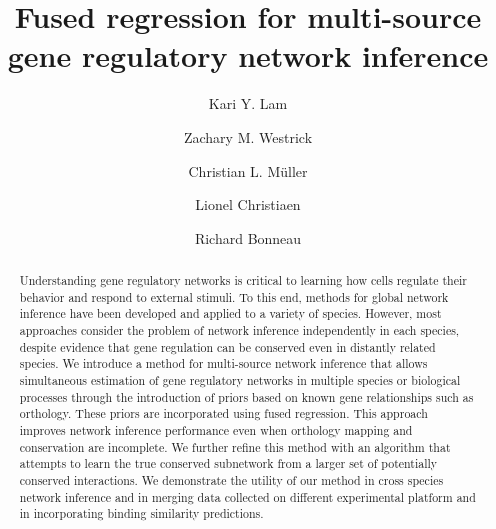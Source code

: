 \documentclass[11pt]{article}
\begin{document}
\title{Fused regression for multi-source gene regulatory network inference}
\author{Kari Y. Lam \and Zachary M. Westrick \and Christian L. M\"{u}ller \and Lionel Christiaen \and Richard Bonneau}
\maketitle

\begin{abstract}
Understanding gene regulatory networks is critical to learning how cells regulate their behavior and respond to external stimuli. To this end, methods for global network inference have been developed and applied to a variety of species. However, most approaches consider the problem of network inference independently in each species, despite evidence that gene regulation can be conserved even in distantly related species. We introduce a method for multi-source network inference that allows simultaneous estimation of gene regulatory networks in multiple species or biological processes through the introduction of priors based on known gene relationships such as orthology. These priors are incorporated using fused regression. This approach improves network inference performance even when orthology mapping and conservation are incomplete. We further refine this method with an algorithm that attempts to learn the true conserved subnetwork from a larger set of potentially conserved interactions. We demonstrate the utility of our method in cross species network inference and in merging data collected on different experimental platform and in incorporating binding similarity predictions.
\end{abstract}
\end{document}
